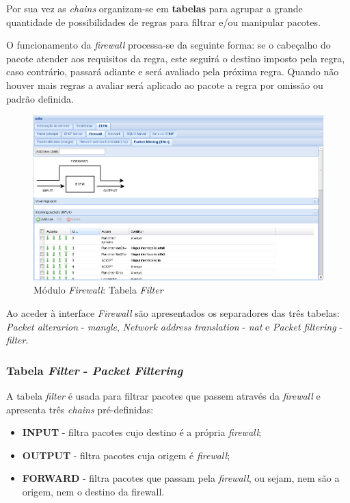 Por sua vez as \textit{chains} organizam-se em \textbf{tabelas} para agrupar a grande quantidade de possibilidades de regras para filtrar e/ou manipular pacotes.

O funcionamento da \textit{firewall} processa-se da seguinte forma: se o cabeçalho do pacote atender aos requisitos da regra, este seguirá o destino imposto pela regra, caso contrário, passará adiante e será avaliado pela próxima regra.
Quando não houver mais regras a avaliar será aplicado ao pacote a regra por omissão ou padrão definida.

\begin{figure}[H]
    \begin{center}
    \includegraphics[scale=0.38]{screenshots/etfw/etfw_firewall_01.png}
    \caption{Módulo \textit{Firewall}: Tabela \textit{Filter} }
    \label{fig:etfw_firewall_01}
    \end{center}
\end{figure}

Ao aceder à interface \textit{Firewall} são apresentados os separadores das três tabelas: \textit{Packet alterarion} - \textit{mangle}, \textit{Network address translation} - \textit{nat} e \textit{Packet filtering} - \textit{filter}.

\subsubsection{Tabela \textit{Filter} - \textit{Packet Filtering}}

A tabela \textit{filter} é usada para filtrar pacotes que passem através da \textit{firewall} e apresenta três \textit{chains} pré-definidas:

\begin{itemize}
    \item \textbf{INPUT} - filtra pacotes cujo destino é a própria \textit{firewall};
    \item \textbf{OUTPUT} - filtra pacotes cuja origem é \textit{firewall};
    \item \textbf{FORWARD} - filtra pacotes que passam pela \textit{firewall}, ou sejam, nem são a origem, nem o destino da firewall.
\end{itemize}

